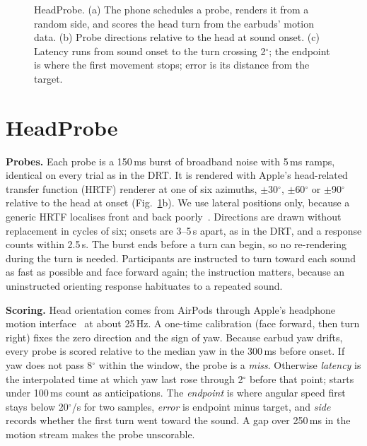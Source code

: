 \documentclass[conference,letterpaper]{IEEEtran}
\begin{document}
\begin{figure}[t]
\caption{HeadProbe. (a) The phone schedules a probe, renders it from a random side, and scores the
head turn from the earbuds' motion data. (b) Probe directions relative to the head at sound onset.
(c) Latency runs from sound onset to the turn crossing 2$^\circ$; the endpoint is where the first
movement stops; error is its distance from the target.}
\label{fig:overview}
\end{figure}

\section{HeadProbe}
\label{sec:system}
\textbf{Probes.} Each probe is a 150\,ms burst of broadband noise with 5\,ms ramps, identical on every
trial as in the DRT. It is rendered with Apple's head-related transfer function (HRTF) renderer at one
of six azimuths, $\pm$30$^\circ$, $\pm$60$^\circ$ or $\pm$90$^\circ$ relative to the head at onset
(Fig.~\ref{fig:overview}b). We use lateral positions only, because a generic HRTF localises front and
back poorly~\cite{wenzel1993localization}. Directions are drawn without replacement in cycles of six;
onsets are 3--5\,s apart, as in the DRT, and a response counts within 2.5\,s. The burst ends before a
turn can begin, so no re-rendering during the turn is needed. Participants are instructed to turn
toward each sound as fast as possible and face forward again; the instruction matters, because an
uninstructed orienting response habituates to a repeated sound.

\textbf{Scoring.} Head orientation comes from AirPods through Apple's headphone motion
interface~\cite{apple2020headphonemotion} at about 25\,Hz. A one-time calibration (face forward, then
turn right) fixes the zero direction and the sign of yaw. Because earbud yaw drifts, every probe is
scored relative to the median yaw in the 300\,ms before onset. If yaw does not pass 8$^\circ$ within
the window, the probe is a \emph{miss}. Otherwise \emph{latency} is the interpolated time at which
yaw last rose through 2$^\circ$ before that point; starts under 100\,ms count as anticipations. The
\emph{endpoint} is where angular speed first stays below 20$^\circ$/s for two samples, \emph{error} is
endpoint minus target, and \emph{side} records whether the first turn went toward the sound. A gap
over 250\,ms in the motion stream makes the probe unscorable.
\end{document}
